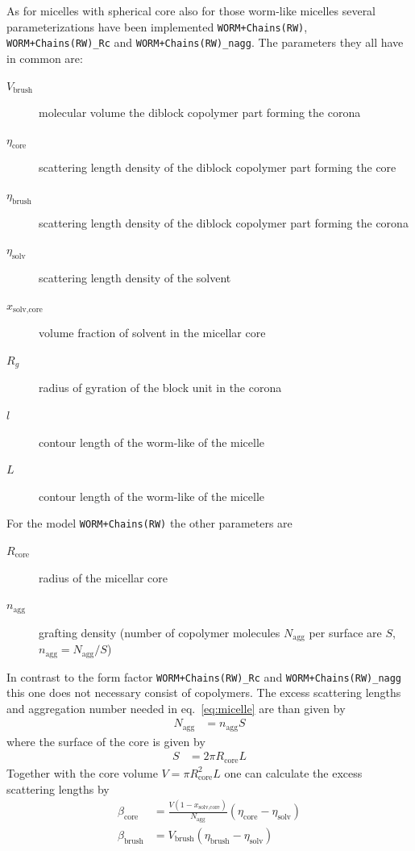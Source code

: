 \noindent
As for micelles with spherical core also for those worm-like micelles several
parameterizations have been implemented \texttt{WORM+Chains(RW)}, \texttt{WORM+Chains(RW)\_Rc} and
\texttt{WORM+Chains(RW)\_nagg}.
The parameters they all have in common are: \sloppy
\begin{description}
\item[$V_\text{brush}$] molecular volume the diblock copolymer part forming the corona
\item[$\eta_\text{core}$] scattering length density of the diblock copolymer part forming the core
\item[$\eta_\text{brush}$] scattering length density of the diblock copolymer part forming the corona
\item[$\eta_\text{solv}$] scattering length density of the solvent
\item[$x_\text{solv,core}$] volume fraction of solvent in the micellar core
\item[$R_g$] radius of gyration of the block unit in the corona
\item[$l$] contour length of the worm-like of the micelle
\item[$L$] contour length of the worm-like of the micelle
\end{description}


\vspace{10mm}

\noindent
For the model \texttt{WORM+Chains(RW)} the other parameters are
\begin{description}
\item[$R_\text{core}$] radius of the micellar core
\item[$n_\text{agg}$] grafting density (number of copolymer molecules
$N_\text{agg}$ per surface are $S$, $n_\text{agg}=N_\text{agg}/S$)
\end{description}

\noindent
In contrast to the form factor \texttt{WORM+Chains(RW)\_Rc} and \texttt{WORM+Chains(RW)\_nagg}
this one does not necessary consist of copolymers.
The excess scattering lengths and aggregation number needed in eq.\
\ref{eq:micelle} are than given by
\begin{align}
N_\text{agg} &= n_\text{agg} S
\end{align}
where the surface of the core is given by
\begin{align}
S  &= 2\pi R_\text{core} L
\end{align}
Together with the core volume $V =\pi R_\text{core}^2 L$
one can calculate the excess scattering lengths by
\begin{align}
\beta_\text{core} &= \frac{V (1-x_\text{solv,core})}{N_\text{agg}}
(\eta_\text{core}-\eta_\text{solv}) \\
\beta_\text{brush} &= V_\text{brush} (\eta_\text{brush}-\eta_\text{solv})
\end{align}

